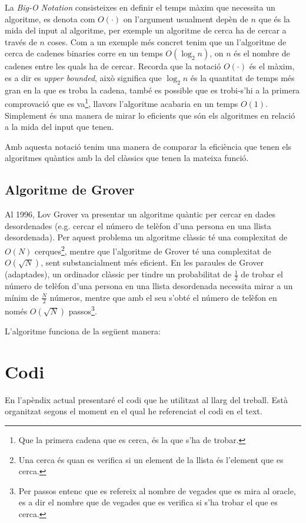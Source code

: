 La \textit{Big-O Notation} consisteixes en definir el temps màxim que necessita un algoritme, es denota com $O(\cdot)$ on l'argument usualment depèn de $n$ que és la mida del input al algoritme, per exemple un algoritme de cerca ha de cercar a través de $n$ coses. Com a un exemple més concret tenim que un l'algoritme de cerca de cadenes binaries corre en un temps $O(\log_{2} n)$, on $n$ és el nombre de cadenes entre les quals ha de cercar. Recorda que la notació $O(\cdot)$ és el màxim, es a dir es \textit{upper bounded}, això significa que $\log_{2} n$ és la quantitat de temps més gran en la que es troba la cadena, també es possible que es trobi-s'hi a la primera comprovació que es va\footnote{Que la primera cadena que es cerca, és la que s'ha de trobar.}, llavors l'algoritme acabaria en un temps $O(1)$. Simplement és una manera de mirar lo eficients que són els algoritmes en relació a la mida del input que tenen.

Amb aquesta notació tenim una manera de comparar la eficiència que tenen els algoritmes quàntics amb la del clàssics que tenen la mateixa funció. 

\section{Algoritme de Grover}
Al 1996, Lov Grover va presentar un algoritme quàntic per cercar en dades desordenades \cite{Grover_96} (e.g. cercar el número de telèfon d'una persona en una llista desordenada). Per aquest problema un algoritme clàssic té una complexitat de $O(N)$ cerques\footnote{Una cerca és quan es verifica si un element de la llista és l'element que es cerca.}, mentre que l'algoritme de Grover té una complexitat de $O(\sqrt{N})$, sent substancialment més eficient. En les paraules de Grover \cite{Grover_96} (adaptades), un ordinador clàssic per tindre un probabilitat de $\frac{1}{2}$ de trobar el número de telèfon d'una persona en una llista desordenada necessita mirar a un mínim de $\frac{N}{2}$ números, mentre que amb el seu s'obté el número de telèfon en només $O(\sqrt{N})$ passos\footnote{Per passos entenc que es refereix al nombre de vegades que es mira al oracle, es a dir el nombre que de vegades que es verifica si s'ha trobar el que es cerca.}.

L'algoritme funciona de la següent manera: 

\chapter{Codi}
En l'apèndix actual presentaré el codi que he utilitzat al llarg del treball. Està organitzat segons el moment en el qual he referenciat el codi en el text.

